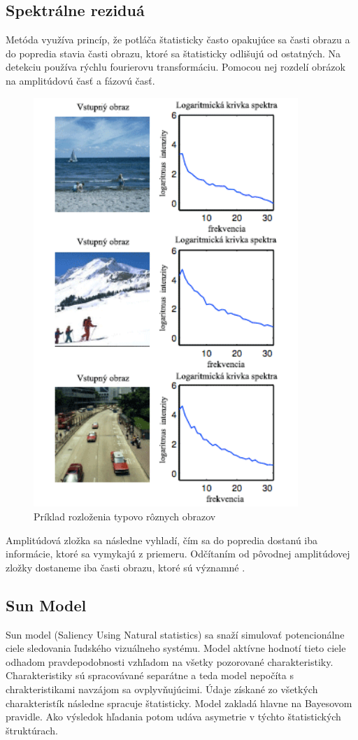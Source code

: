 \subsection{Spektrálne reziduá}
Metóda využíva princíp, že potláča štatisticky často opakujúce sa časti obrazu a do popredia stavia časti obrazu, ktoré sa štatisticky odlišujú od ostatných.
Na detekciu používa rýchlu fourierovu transformáciu.
Pomocou nej rozdelí obrázok na amplitúdovú časť a fázovú časť.

\begin{figure}[H]
  \centering
  \includegraphics[width=10cm]{pics/spectral-img.png}
  \caption{Príklad rozloženia typovo rôznych obrazov\cite{spectral-rezidual}}\label{wrap-fig:2}
\end{figure}
\vspace{10mm}

Amplitúdová zložka sa následne vyhladí, čím sa do popredia dostanú iba informácie, ktoré sa vymykajú z priemeru.
Odčítaním od pôvodnej amplitúdovej zložky dostaneme iba časti obrazu, ktoré sú významné \cite{spectral-rezidual}.
\subsection{Sun Model}
Sun model (Saliency Using Natural statistics) sa snaží simulovať potencionálne ciele sledovania ľudského vizuálneho systému.
Model aktívne hodnotí tieto ciele odhadom pravdepodobnosti vzhľadom na všetky pozorované charakteristiky.
Charakteristiky sú spracovávané separátne a teda model nepočíta s chrakteristikami navzájom sa ovplyvňujúcimi.
Údaje získané zo všetkých charakteristík následne spracuje štatisticky.
Model zakladá hlavne na Bayesovom pravidle.
Ako výsledok hľadania potom udáva asymetrie v týchto štatistických štruktúrach\cite{sun-1}.
